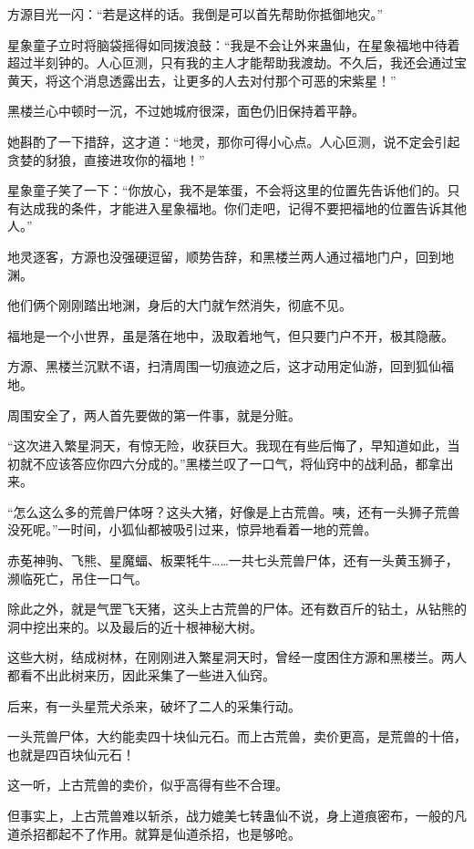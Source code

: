 \begin{this_body}
方源目光一闪：“若是这样的话。我倒是可以首先帮助你抵御地灾。”

星象童子立时将脑袋摇得如同拨浪鼓：“我是不会让外来蛊仙，在星象福地中待着超过半刻钟的。人心叵测，只有我的主人才能帮助我渡劫。不久后，我还会通过宝黄天，将这个消息透露出去，让更多的人去对付那个可恶的宋紫星！”

黑楼兰心中顿时一沉，不过她城府很深，面色仍旧保持着平静。

她斟酌了一下措辞，这才道：“地灵，那你可得小心点。人心叵测，说不定会引起贪婪的豺狼，直接进攻你的福地！”

星象童子笑了一下：“你放心，我不是笨蛋，不会将这里的位置先告诉他们的。只有达成我的条件，才能进入星象福地。你们走吧，记得不要把福地的位置告诉其他人。”

地灵逐客，方源也没强硬逗留，顺势告辞，和黑楼兰两人通过福地门户，回到地渊。

他们俩个刚刚踏出地渊，身后的大门就乍然消失，彻底不见。

福地是一个小世界，虽是落在地中，汲取着地气，但只要门户不开，极其隐蔽。

方源、黑楼兰沉默不语，扫清周围一切痕迹之后，这才动用定仙游，回到狐仙福地。

周围安全了，两人首先要做的第一件事，就是分赃。

“这次进入繁星洞天，有惊无险，收获巨大。我现在有些后悔了，早知道如此，当初就不应该答应你四六分成的。”黑楼兰叹了一口气，将仙窍中的战利品，都拿出来。

“怎么这么多的荒兽尸体呀？这头大猪，好像是上古荒兽。咦，还有一头狮子荒兽没死呢。”一时间，小狐仙都被吸引过来，惊异地看着一地的荒兽。

赤莬神驹、飞熊、星魔蝠、板栗牦牛……一共七头荒兽尸体，还有一头黄玉狮子，濒临死亡，吊住一口气。

除此之外，就是气罡飞天猪，这头上古荒兽的尸体。还有数百斤的钻土，从钻熊的洞中挖出来的。以及最后的近十根神秘大树。

这些大树，结成树林，在刚刚进入繁星洞天时，曾经一度困住方源和黑楼兰。两人都看不出此树来历，因此采集了一些进入仙窍。

后来，有一头星荒犬杀来，破坏了二人的采集行动。

一头荒兽尸体，大约能卖四十块仙元石。而上古荒兽，卖价更高，是荒兽的十倍，也就是四百块仙元石！

这一听，上古荒兽的卖价，似乎高得有些不合理。

但事实上，上古荒兽难以斩杀，战力媲美七转蛊仙不说，身上道痕密布，一般的凡道杀招都起不了作用。就算是仙道杀招，也是够呛。


\end{this_body}
